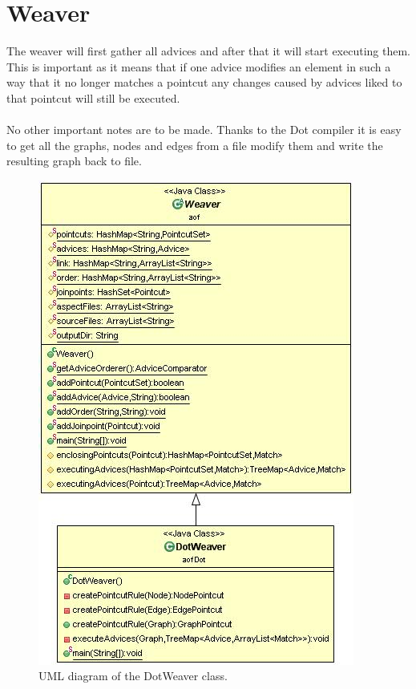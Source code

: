 \documentclass[a4paper]{report}
\begin{document}
\section{Weaver}
The weaver will first gather all advices and after that it will start executing them. This is important as it means that if one advice modifies an element in such a way that it no longer matches a pointcut any changes caused by advices liked to that pointcut will still be executed.\\
\\
No other important notes are to be made. Thanks to the Dot compiler it is easy to get all the graphs, nodes and edges from a file modify them and write the resulting graph back to file.\\
\begin{figure}
\centering
\includegraphics[scale=0.7]{images/AOFDot/DotWeaver.jpg}
\caption{UML diagram of the DotWeaver class.}
\label{fig:DotWeaver}
\end{figure}
\end{document}
